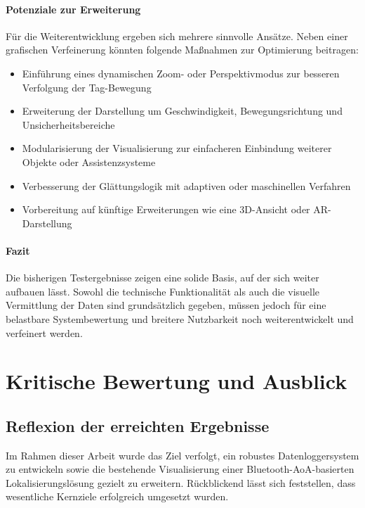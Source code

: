 \documentclass[a4paper, 12pt]{article} %
\begin{document}
\paragraph{Potenziale zur Erweiterung}

Für die Weiterentwicklung ergeben sich mehrere sinnvolle Ansätze. Neben einer grafischen Verfeinerung könnten folgende Maßnahmen zur 
Optimierung beitragen:

\begin{itemize}
    \item Einführung eines dynamischen Zoom- oder Perspektivmodus zur besseren Verfolgung der Tag-Bewegung
    \item Erweiterung der Darstellung um Geschwindigkeit, Bewegungsrichtung und Unsicherheitsbereiche
    \item Modularisierung der Visualisierung zur einfacheren Einbindung weiterer Objekte oder Assistenzsysteme
    \item Verbesserung der Glättungslogik mit adaptiven oder maschinellen Verfahren
    \item Vorbereitung auf künftige Erweiterungen wie eine 3D-Ansicht oder AR-Darstellung
\end{itemize}

\paragraph{Fazit}

Die bisherigen Testergebnisse zeigen eine solide Basis, auf der sich weiter aufbauen lässt. Sowohl die technische Funktionalität als auch die visuelle
Vermittlung der Daten sind grundsätzlich gegeben, müssen jedoch für eine belastbare Systembewertung und breitere Nutzbarkeit noch weiterentwickelt und 
verfeinert werden.

\section{Kritische Bewertung und Ausblick}
\subsection{Reflexion der erreichten Ergebnisse}

Im Rahmen dieser Arbeit wurde das Ziel verfolgt, ein robustes Datenloggersystem zu entwickeln sowie die bestehende Visualisierung einer 
Bluetooth-\ac{AoA}-basierten Lokalisierungslösung gezielt zu erweitern. Rückblickend lässt sich feststellen, dass wesentliche Kernziele erfolgreich 
umgesetzt wurden.
\end{document}
